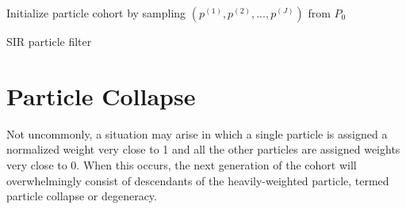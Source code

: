 \documentclass[12pt]{article}
\begin{document}
    \begin{algorithm}[H]

        \BlankLine

        \DontPrintSemicolon


        \BlankLine

        Initialize particle cohort by sampling $(p^{(1)}, p^{(2)}, ..., p^{(J)})$ from $P_0$

        \BlankLine


        \BlankLine


        \BlankLine

        \caption{SIR particle filter}\label{pfsir}

    \end{algorithm}

\section{Particle Collapse}

	Not uncommonly, a situation may arise in which a single particle is assigned a normalized weight very close to 1 and all the other particles are assigned weights very close to 0. When this occurs, the next generation of the cohort will overwhelmingly consist of descendants of the heavily-weighted particle, termed particle collapse or degeneracy.
\end{document}
